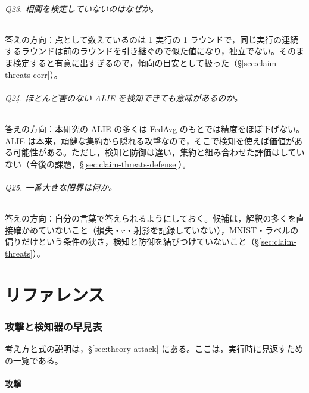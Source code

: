 \documentclass[a4j, dvipdfmx]{jsarticle}  %
\begin{document}
\paragraph{Q23. 相関を検定していないのはなぜか。}
答えの方向：点として数えているのは 1 実行の 1 ラウンドで，同じ実行の連続するラウンドは前のラウンドを引き継ぐので似た値になり，独立でない。そのまま検定すると有意に出すぎるので，傾向の目安として扱った（\S\ref{sec:claim-threats-corr}）。

\paragraph{Q24. ほとんど害のない ALIE を検知できても意味があるのか。}
答えの方向：本研究の ALIE の多くは FedAvg のもとでは精度をほぼ下げない。ALIE は本来，頑健な集約から隠れる攻撃なので，そこで検知を使えば価値がある可能性がある。ただし，検知と防御は違い，集約と組み合わせた評価はしていない（今後の課題，\S\ref{sec:claim-threats-defense}）。

\paragraph{Q25. 一番大きな限界は何か。}
答えの方向：自分の言葉で答えられるようにしておく。候補は，解釈の多くを直接確かめていないこと（損失・$r$・射影を記録していない），MNIST・ラベルの偏りだけという条件の狭さ，検知と防御を結びつけていないこと（\S\ref{sec:claim-threats}）。

\part{リファレンス}
\label{part:reference}

\section{攻撃と検知器の早見表}
\label{sec:attack}

考え方と式の説明は，\S\ref{sec:theory-attack} にある。ここは，実行時に見返すための一覧である。

\subsection{攻撃}
\end{document}
